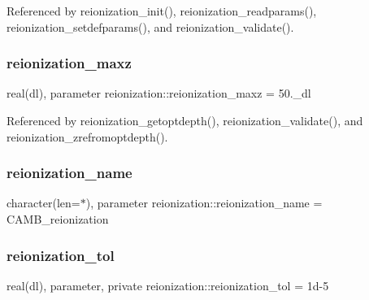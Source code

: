 Referenced by reionization\+\_\+init(), reionization\+\_\+readparams(), reionization\+\_\+setdefparams(), and reionization\+\_\+validate().

\mbox{\label{namespacereionization_a5631e22e02e0694f1813b80cdd6004c1}} 
\subsubsection{\texorpdfstring{reionization\+\_\+maxz}{reionization\_maxz}}
{\footnotesize\ttfamily real(dl), parameter reionization\+::reionization\+\_\+maxz = 50.\+\_\+dl}



Referenced by reionization\+\_\+getoptdepth(), reionization\+\_\+validate(), and reionization\+\_\+zrefromoptdepth().

\mbox{\label{namespacereionization_a0f6786ae38db76cf41888ab5184a33e3}} 
\subsubsection{\texorpdfstring{reionization\+\_\+name}{reionization\_name}}
{\footnotesize\ttfamily character(len=$\ast$), parameter reionization\+::reionization\+\_\+name = \textquotesingle{}C\+A\+M\+B\+\_\+reionization\textquotesingle{}}

\mbox{\label{namespacereionization_a4d46e2413c850ed23c74c3808d8ac06b}} 
\subsubsection{\texorpdfstring{reionization\+\_\+tol}{reionization\_tol}}
{\footnotesize\ttfamily real(dl), parameter, private reionization\+::reionization\+\_\+tol = 1d-\/5\hspace{0.3cm}{\ttfamily [private]}}



